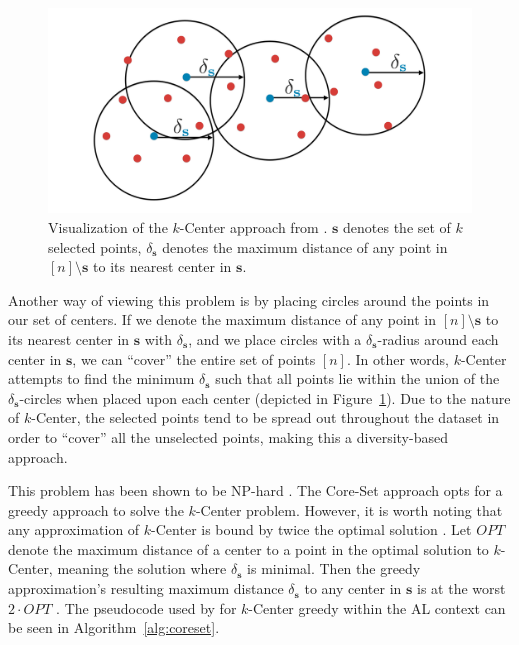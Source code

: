 \documentclass[english,bachelor,ul]{webisthesis} %
\begin{document}
\vspace{0.2\baselineskip}

\begin{figure}[htbp]
    \centering
    \includegraphics[width=1\textwidth]{img/coreset.png}
    \caption{Visualization of the $k$-Center approach from \cite{DBLP:conf/iclr/SenerS18}. $ \mathbf{s} $ denotes the set of $ k $ selected points, $ \delta_{\mathbf{s}} $ denotes the maximum distance of any point in $ [n] \setminus \mathbf{s} $ to its nearest center in $ \mathbf{s} $.}
    \label{fig:coreset}
\end{figure}

Another way of viewing this problem is by placing circles around the points in our set of centers. If we denote the maximum distance of any point in $ [n] \setminus \mathbf{s} $ to its nearest center in $ \mathbf{s} $ with $ \delta_{\mathbf{s}} $, and we place circles with a $ \delta_{\mathbf{s}} $-radius around each center in $ \mathbf{s} $, we can ``cover'' the entire set of points $ [n] $. In other words, $k$-Center attempts to find the minimum $ \delta_{\mathbf{s}} $ such that all points lie within the union of the $ \delta_{\mathbf{s}} $-circles when placed upon each center (depicted in Figure~\ref{fig:coreset}). Due to the nature of $k$-Center, the selected points tend to be spread out throughout the dataset in order to ``cover'' all the unselected points, making this a diversity-based approach. 

This problem has been shown to be NP-hard \citep{DBLP:journals/dam/HsuN79, DBLP:journals/anor/Hochbaum84}. The Core-Set approach opts for a greedy approach to solve the $k$-Center problem. However, it is worth noting that any approximation of $k$-Center is bound by twice the optimal solution \citep{DBLP:journals/dam/HsuN79}. Let $ OPT $ denote the maximum distance of a center to a point in the optimal solution to $k$-Center, meaning the solution where $\delta_{\mathbf{s}} $ is minimal. Then the greedy approximation's resulting maximum distance $ \delta_{\mathbf{s}} $ to any center in $ \mathbf{s} $ is at the worst $ 2 \cdot OPT $ \citep{mountkcenter}. The pseudocode used by \cite{DBLP:conf/iclr/SenerS18} for $k$-Center greedy within the AL context can be seen in Algorithm~\ref{alg:coreset}.
\end{document}
